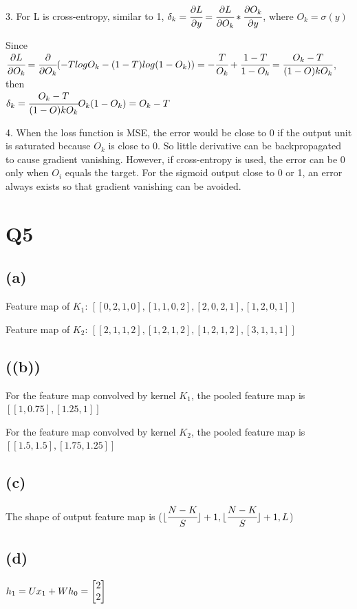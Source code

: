\documentclass[]{article}
\begin{document}
3. For L is cross-entropy, similar to 1, $\delta_k=\cfrac{\partial L}{\partial y}=\cfrac{\partial L}{\partial O_k}*\cfrac{\partial O_k}{\partial y}$, where $O_k=\sigma(y)$

Since $\cfrac{\partial{L}}{\partial O_k}=\cfrac{\partial}{\partial O_k}(-TlogO_k-(1-T)log(1-O_k))=-\cfrac{T}{O_k}+\cfrac{1-T}{1-O_k}=\cfrac{O_k-T}{(1-O)kO_k}$, then \\
$\delta_k=\cfrac{O_k-T}{(1-O)kO_k}O_k(1-O_k)=O_k-T$

4. When the loss function is MSE, the error would be close to 0 if the output unit is saturated because $O_k$ is close to 0. So little derivative can be backpropagated to cause gradient vanishing. However, if cross-entropy is used, the error can be 0 only when $O_i$ equals the target. For the sigmoid output close to 0 or 1, an error always exists so that gradient vanishing can be avoided. 


\newpage

\section*{Q5}
\subsection*{(a)}
Feature map of $K_1$: $[[0, 2, 1, 0],[1, 1, 0, 2],[2, 0, 2, 1],[1, 2, 0, 1]]$ 

Feature map of $K_2$: $[[2, 1, 1, 2],[1, 2, 1, 2],[1, 2, 1, 2],[3, 1, 1, 1]]$

\subsection*{((b))}
For the feature map convolved by kernel $K_1$, the pooled feature map is $[[1,0.75],[1.25,1]]$

For the feature map convolved by kernel $K_2$, the pooled feature map is $[[1.5,1.5],[1.75,1.25]]$

\subsection*{(c)} 
The shape of output feature map is ($\lfloor\cfrac{N-K}{S}\rfloor+1, \lfloor\cfrac{N-K}{S}\rfloor+1, L$)


\subsection*{(d)}
$h_1=Ux_1+Wh_0=\newmat{2\\2}$
\end{document}
